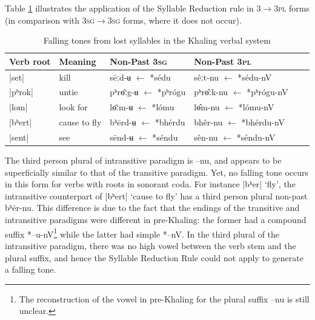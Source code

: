 \documentclass[oldfontcommands,oneside,a4paper,11pt]{article}
\newcommand{\ipa}[1]{{\phon \mbox{#1}}} %
\begin{document}
Table  \ref{tab:falling.verb2} illustrates the application of the Syllable Reduction rule in \textsc{3$\rightarrow$3pl} forms (in comparison with \textsc{3sg$\rightarrow$3sg} forms, where it does not occur).%
 
\begin{table}[h] 
\caption{Falling tones from lost syllables in the Khaling verbal system} \centering  \label{tab:falling.verb2} 
\begin{tabular}{llllll} 
\toprule 
Verb root	&Meaning	&Non-Past \textsc{3sg} & Non-Past \textsc{3pl} & \\ 
\midrule 
|\ipa{set}|	&	kill			&\ipa{sēːd-ʉ} $\leftarrow$ \ipa{*sédu} &\ipa{sêːt-nu} $\leftarrow$ \ipa{*sédu-nV} \\ 
|\ipa{pʰrok}|	&	untie		&\ipa{pʰrɵ̄ːg-ʉ} $\leftarrow$ \ipa{*pʰrógu} &\ipa{pʰrɵ̂ːk-nu} $\leftarrow$  \ipa{*pʰrógu-nV} \\
|\ipa{lom}|	&	look for		&\ipa{lɵ̄ːm-ʉ} $\leftarrow$ \ipa{*lómu} &\ipa{lɵ̂m-nu} $\leftarrow$ \ipa{*lómu-nV} \\ 
\midrule
|\ipa{bʰert}|	&	cause to fly			&\ipa{bʰērd-ʉ} $\leftarrow$ \ipa{*bhérdu}&\ipa{bhêr-nu} $\leftarrow$ \ipa{*bhérdu-nV} \\ 
|\ipa{sent}|	&	see			&\ipa{sēnd-ʉ} $\leftarrow$ \ipa{*séndu} &\ipa{sên-nu} $\leftarrow$ \ipa{*séndu-nV} \\ 
\bottomrule 
\end{tabular} 
\end{table} 
The  third person plural of intransitive paradigm is \ipa{--nu}, and appears to be superficially similar to that of the transitive paradigm. Yet,  no falling tone occurs in this form for verbs with roots in sonorant coda. For instance |\ipa{bʰer}| `fly', the intransitive counterpart of |\ipa{bʰert}|	`cause to fly' has a third person plural non-past \ipa{bʰēr-nu}. This difference is due to the fact that the endings of the transitive and  intransitive paradigms were different in pre-Khaling: the former had a compound suffix \ipa{*--u-nV}\footnote{The reconstruction of the vowel in pre-Khaling for the plural suffix \ipa{--nu} is still unclear.} while the latter had simple \ipa{*--nV}. In the third plural of the intransitive paradigm, there was no high vowel between the verb stem and the plural suffix, and hence the Syllable Reduction Rule could not apply to generate a falling tone.
\end{document}
